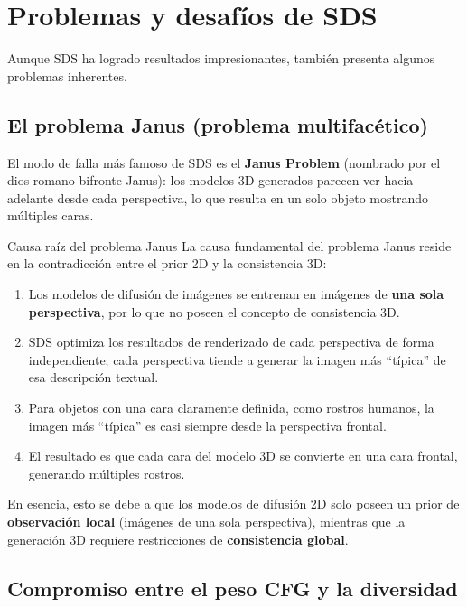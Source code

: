 \section{Problemas y desafíos de SDS}

Aunque SDS ha logrado resultados impresionantes, también presenta algunos problemas inherentes.

\subsection{El problema Janus (problema multifacético)}

El modo de falla más famoso de SDS es el \textbf{Janus Problem} (nombrado por el dios romano bifronte Janus): los modelos 3D generados parecen ver hacia adelante desde cada perspectiva, lo que resulta en un solo objeto mostrando múltiples caras.

\begin{warningbox}{Causa raíz del problema Janus}
La causa fundamental del problema Janus reside en la contradicción entre el prior 2D y la consistencia 3D:

\begin{enumerate}
    \item Los modelos de difusión de imágenes se entrenan en imágenes de \textbf{una sola perspectiva}, por lo que no poseen el concepto de consistencia 3D.
    \item SDS optimiza los resultados de renderizado de cada perspectiva de forma independiente; cada perspectiva tiende a generar la imagen más ``típica'' de esa descripción textual.
    \item Para objetos con una cara claramente definida, como rostros humanos, la imagen más ``típica'' es casi siempre desde la perspectiva frontal.
    \item El resultado es que cada cara del modelo 3D se convierte en una cara frontal, generando múltiples rostros.
\end{enumerate}

En esencia, esto se debe a que los modelos de difusión 2D solo poseen un prior de \textbf{observación local} (imágenes de una sola perspectiva), mientras que la generación 3D requiere restricciones de \textbf{consistencia global}.
\end{warningbox}

\subsection{Compromiso entre el peso CFG y la diversidad}

